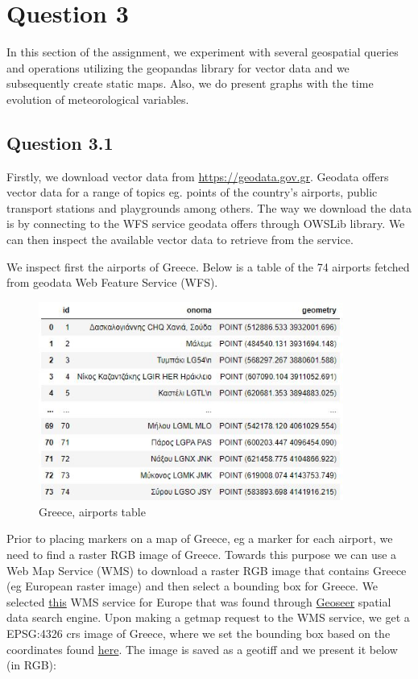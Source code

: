 \section{Question 3}
In this section of the assignment, we experiment with several geospatial queries and operations utilizing the geopandas library for vector data and we subsequently create static maps. Also, we do present graphs with the time evolution of meteorological variables.

\subsection{Question 3.1}
Firstly, we download vector data from \href{https://geodata.gov.gr}{https://geodata.gov.gr}. Geodata offers vector data for a range of topics eg. points of the country's airports, public transport stations and playgrounds among others. The way we download the data is by connecting to the WFS service geodata offers through OWSLib library. We can then inspect the available vector data to retrieve from the service.

We inspect first the airports of Greece. Below is a table of the 74 airports fetched from geodata Web Feature Service (WFS).

\begin{figure}[h]
    \centering
    \includegraphics[width=10cm]{figures/q3_1_airports_df.JPG}
    \caption{Greece, airports table}
    \label{fig:Greece, airports table}
\end{figure}
\FloatBarrier %

Prior to placing markers on a map of Greece, eg a marker for each airport, we need to find a raster RGB image of Greece. Towards this purpose we can use a Web Map Service (WMS) to download a raster RGB image that contains Greece (eg European raster image) and then select a bounding box for Greece. We selected \href{https://www.geoseer.net/rl.php?ql=78ea2e14b2fdd525&p=1&q=landsat\%20150\%20Europe#}{this} WMS service for Europe that was found through \href{https://www.geoseer.net}{Geoseer} spatial data search engine. Upon making a getmap request to the WMS service, we get a EPSG:4326 crs image of Greece, where we set the bounding box based on the coordinates found \href{https://gist.github.com/graydon/11198540}{here}. The image is saved as a geotiff and we present it below (in RGB):

